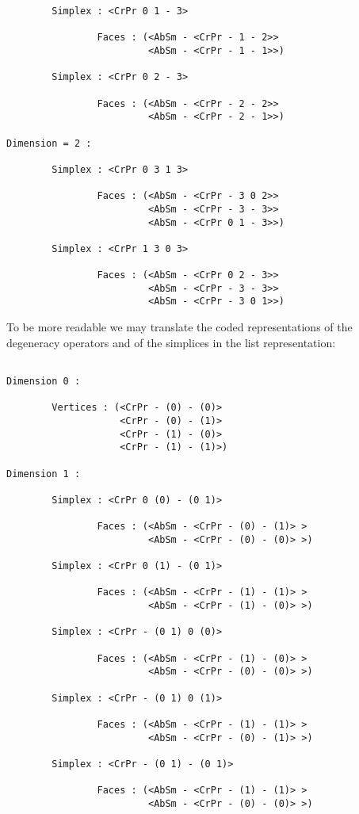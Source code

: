 {{\begin{verbatim}
        Simplex : <CrPr 0 1 - 3>

                Faces : (<AbSm - <CrPr - 1 - 2>>
                         <AbSm - <CrPr - 1 - 1>>)

        Simplex : <CrPr 0 2 - 3>

                Faces : (<AbSm - <CrPr - 2 - 2>>
                         <AbSm - <CrPr - 2 - 1>>)

Dimension = 2 :

        Simplex : <CrPr 0 3 1 3>

                Faces : (<AbSm - <CrPr - 3 0 2>>
                         <AbSm - <CrPr - 3 - 3>>
                         <AbSm - <CrPr 0 1 - 3>>)

        Simplex : <CrPr 1 3 0 3>

                Faces : (<AbSm - <CrPr 0 2 - 3>>
                         <AbSm - <CrPr - 3 - 3>>
                         <AbSm - <CrPr - 3 0 1>>)
\end{verbatim}}
To be more readable we may translate the coded representations of the de\-ge\-ne\-ra\-cy operators
and of the simplices in the list representation:
{\footnotesize\begin{verbatim}

Dimension 0 :

        Vertices : (<CrPr - (0) - (0)>
                    <CrPr - (0) - (1)>
                    <CrPr - (1) - (0)>
                    <CrPr - (1) - (1)>)

Dimension 1 :

        Simplex : <CrPr 0 (0) - (0 1)>

                Faces : (<AbSm - <CrPr - (0) - (1)> >
                         <AbSm - <CrPr - (0) - (0)> >)

        Simplex : <CrPr 0 (1) - (0 1)>

                Faces : (<AbSm - <CrPr - (1) - (1)> >
                         <AbSm - <CrPr - (1) - (0)> >)

        Simplex : <CrPr - (0 1) 0 (0)>

                Faces : (<AbSm - <CrPr - (1) - (0)> >
                         <AbSm - <CrPr - (0) - (0)> >)

        Simplex : <CrPr - (0 1) 0 (1)>

                Faces : (<AbSm - <CrPr - (1) - (1)> >
                         <AbSm - <CrPr - (0) - (1)> >)

        Simplex : <CrPr - (0 1) - (0 1)>

                Faces : (<AbSm - <CrPr - (1) - (1)> >
                         <AbSm - <CrPr - (0) - (0)> >)


\end{verbatim}}}

